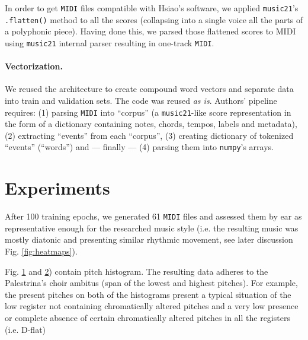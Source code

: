 \documentclass{article}
\begin{document}
\begin{multicols}{2}
        In order to get \texttt{MIDI} files compatible with Hsiao's software, we 
        applied \texttt{music21}'s \texttt{.flatten()} method to all the scores (collapsing into a single voice all the parts of a polyphonic piece). Having done this, we parsed those flattened scores to MIDI using \texttt{music21} internal parser resulting in one-track \texttt{MIDI}.

        \paragraph{Vectorization.}
        We reused the \cite{hsiao_compound_2021} architecture to create compound word vectors and separate data into train and validation sets. The code was reused \emph{as is}. Authors' pipeline requires: (1) parsing \texttt{MIDI} into ``corpus'' (a \texttt{music21}-like score representation in the form of a dictionary containing notes, chords, tempos, labels and metadata), (2) extracting ``events'' from each ``corpus'', (3) creating dictionary of tokenized ``events'' (``words'') and --- finally --- (4) parsing them into \texttt{numpy}'s arrays.
        
    \section{Experiments}

        After 100 training epochs, we generated 61 \texttt{MIDI} files and assessed them by ear as representative enough for the researched music style (i.e. the resulting music was mostly diatonic and presenting similar rhythmic movement, see later discussion Fig. \ref{fig:heatmaps}).
        
        Fig. \ref{fig:palestrinaHisto} and \ref{fig:generatedHisto}) contain pitch histogram. The resulting data adheres to the Palestrina's choir ambitus (span of the lowest and highest pitches). For example, the present pitches on both of the histograms present a typical situation of the low register not containing chromatically altered pitches and a very low presence or complete absence of certain chromatically altered pitches in all the registers (i.e. D-flat)

\end{multicols}

    \begin{figure}[H]
        \centering\resizebox{0.8\linewidth}{!}{}
        \label{fig:palestrinaHisto}
    \end{figure}
    \begin{figure}[H]
        \centering\resizebox{0.8\linewidth}{!}{}
        \label{fig:generatedHisto}
    \end{figure}
\end{document}
